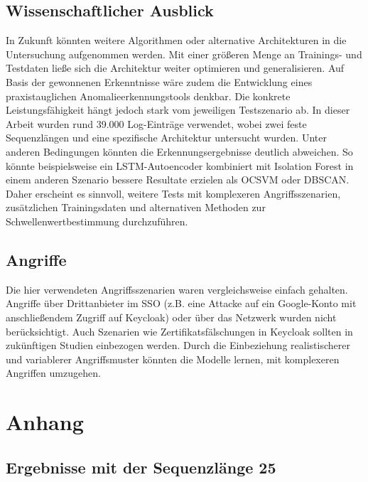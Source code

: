\documentclass[a4paper,12pt]{article}
\begin{document}
	\subsection{Wissenschaftlicher Ausblick}
	In Zukunft könnten weitere Algorithmen oder alternative Architekturen in die Untersuchung aufgenommen werden. Mit einer größeren Menge an Trainings- und Testdaten ließe sich die Architektur weiter optimieren und generalisieren. Auf Basis der gewonnenen Erkenntnisse wäre zudem die Entwicklung eines praxistauglichen Anomalieerkennungstools denkbar. Die konkrete Leistungsfähigkeit hängt jedoch stark vom jeweiligen Testszenario ab.
	In dieser Arbeit wurden rund 39.000 Log-Einträge verwendet, wobei zwei feste Sequenzlängen und eine spezifische Architektur untersucht wurden. Unter anderen Bedingungen könnten die Erkennungsergebnisse deutlich abweichen. So könnte beispielsweise ein LSTM-Autoencoder kombiniert mit Isolation Forest in einem anderen Szenario bessere Resultate erzielen als OCSVM oder DBSCAN.
	Daher erscheint es sinnvoll, weitere Tests mit komplexeren Angriffsszenarien, zusätzlichen Trainingsdaten und alternativen Methoden zur Schwellenwertbestimmung durchzuführen.
	
	\subsection{Angriffe}
	Die hier verwendeten Angriffsszenarien waren vergleichsweise einfach gehalten. Angriffe über Drittanbieter im SSO (z.B. eine Attacke auf ein Google-Konto mit anschließendem Zugriff auf Keycloak) oder über das Netzwerk wurden nicht berücksichtigt. Auch Szenarien wie Zertifikatsfälschungen in Keycloak sollten in zukünftigen Studien einbezogen werden. Durch die Einbeziehung realistischerer und variablerer Angriffsmuster könnten die Modelle lernen, mit komplexeren Angriffen umzugehen.
	
\newpage
 
\newpage 
\renewcommand{\notesname}{Fußnotenverzeichnis}
\renewcommand{\enoteformat}{\rightskip0pt\leftskip0pt\vspace{0.5em}\noindent\makebox[2em][l]{\theenmark}}
\theendnotes
\newpage

\section*{Anhang}
\subsection*{Ergebnisse mit der Sequenzlänge 25}
\end{document}
